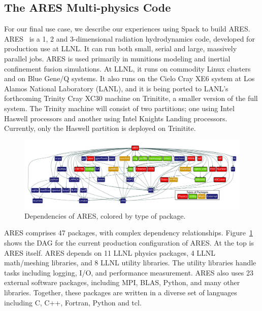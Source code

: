
\subsection{The ARES Multi-physics Code}
\label{sec:ares}

For our final use case, we describe our experiences using Spack to build ARES.
ARES~\cite{ares1,ares2} is a 1, 2 and 3-dimensional radiation hydrodynamics code,
developed for production use at LLNL.  It can run both small, serial
and large, massively parallel jobs. ARES is used primarily in munitions modeling
and inertial confinement fusion simulations.
%
At LLNL, it runs on commodity Linux clusters and on Blue Gene/Q systems.
It also runs on the Cielo Cray XE6 system at Los Alamos National Laboratory (LANL), and
it is being ported to LANL's forthcoming Trinity Cray XC30 machine on Trinitite,
a smaller version of the full system.  The Trinity machine will consist of two partitions;
one using Intel Haswell processors and another using Intel Knights Landing processors.
Currently, only the Haswell partition is deployed on Trinitite.

\begin{figure}[t]
	\includegraphics[width=\textwidth]{figs/ares-dot/ares-fig.pdf}
	\caption{
		Dependencies of ARES, colored by type of package.
		\label{fig:ares}
	}
\end{figure}

ARES comprises 47 packages, with complex dependency relationships. 
Figure~\ref{fig:ares} shows the DAG for the current production configuration 
of ARES. At the top is ARES itself.  ARES depends on 11 LLNL physics packages,
4 LLNL math/meshing libraries, and 8 LLNL utility libraries.
The utility libraries handle tasks including logging, I/O, and 
performance measurement. ARES also uses 23 external software packages, 
including MPI, BLAS, Python, and many other libraries.  Together, these 
packages are written in a diverse set of languages including C, C++, 
Fortran, Python and tcl.

